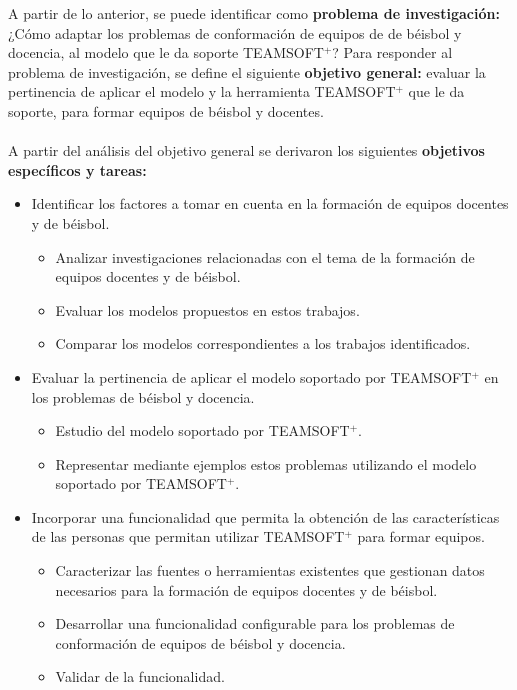 A partir de lo anterior, se puede identificar como \textbf{problema de investigación:} ¿Cómo adaptar los problemas de conformación de equipos de de béisbol y docencia, al modelo que le da soporte TEAMSOFT$^+$? Para responder al problema de investigación, se define el siguiente \textbf{objetivo general:} evaluar la pertinencia de aplicar el modelo y la herramienta TEAMSOFT$^+$ que le da soporte, para formar equipos de béisbol y docentes.\\\\
A partir del análisis del objetivo general se derivaron los siguientes \textbf{objetivos específicos y tareas:}
\begin{itemize}		
	\item Identificar los factores a tomar en cuenta en la formación de equipos docentes y de béisbol.
		\begin{itemize}
			\item Analizar investigaciones relacionadas con el tema de la formación de equipos docentes y de béisbol.
			\item Evaluar los modelos propuestos en estos trabajos.
			\item Comparar los modelos correspondientes a los trabajos identificados.
		\end{itemize}
	
	\item Evaluar la pertinencia de aplicar el modelo soportado por TEAMSOFT$^+$ en los problemas de béisbol y docencia.
		\begin{itemize}
			\item Estudio del modelo soportado por TEAMSOFT$^+$.
			\item Representar mediante ejemplos estos problemas utilizando el modelo soportado por TEAMSOFT$^+$.
		\end{itemize}
		
	\item Incorporar una funcionalidad que permita la obtención de las características de las personas que permitan utilizar TEAMSOFT$^+$ para formar equipos.
		\begin{itemize}
			\item Caracterizar las fuentes o herramientas existentes que gestionan datos necesarios para la formación de equipos docentes y de béisbol.
			\item Desarrollar una funcionalidad configurable para los problemas de conformación de equipos de béisbol y docencia.
			\item Validar de la funcionalidad.
		\end{itemize}
\end{itemize}


